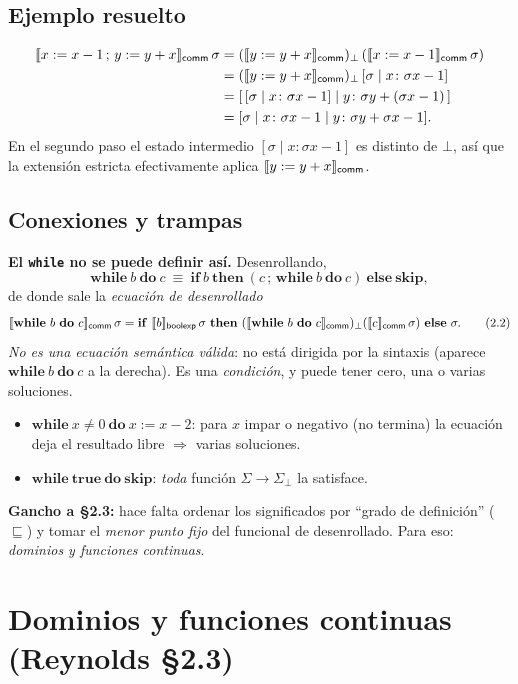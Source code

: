 \subsection*{Ejemplo resuelto}
\[
\begin{aligned}
\llbracket x := x-1\,;\,y := y+x \rrbracket_{\mathsf{comm}}\,\sigma
&= (\llbracket y := y+x \rrbracket_{\mathsf{comm}})_\bot\,(\llbracket x := x-1 \rrbracket_{\mathsf{comm}}\,\sigma) \\
&= (\llbracket y := y+x \rrbracket_{\mathsf{comm}})_\bot\,[\sigma \mid x\colon \sigma x - 1] \\
&= [\,[\sigma \mid x\colon \sigma x - 1] \mid y\colon \sigma y + (\sigma x - 1)\,] \\
&= [\sigma \mid x\colon \sigma x - 1 \mid y\colon \sigma y + \sigma x - 1].
\end{aligned}
\]
En el segundo paso el estado intermedio $[\sigma \mid x\colon \sigma x - 1]$ es
distinto de $\bot$, así que la extensión estricta efectivamente aplica
$\llbracket y := y+x \rrbracket_{\mathsf{comm}}$.

\subsection*{Conexiones y trampas}
\textbf{El \texttt{while} no se puede definir así.} Desenrollando,
\[
\mathbf{while}\ b\ \mathbf{do}\ c \ \equiv\
\mathbf{if}\ b\ \mathbf{then}\ (c\,;\,\mathbf{while}\ b\ \mathbf{do}\ c)\ \mathbf{else}\ \mathbf{skip},
\]
de donde sale la \emph{ecuación de desenrollado}
\[
\semc{\mathbf{while}\ b\ \mathbf{do}\ c}\,\sigma
= \mathbf{if}\ \semb{b}\,\sigma\ \mathbf{then}\
   (\semc{\mathbf{while}\ b\ \mathbf{do}\ c})_\bot(\semc{c}\,\sigma)\ \mathbf{else}\ \sigma.
\tag{2.2}
\]
\emph{No es una ecuación semántica válida}: no está dirigida por la sintaxis
(aparece $\mathbf{while}\ b\ \mathbf{do}\ c$ a la derecha). Es una \emph{condición},
y puede tener cero, una o varias soluciones.
\begin{itemize}
  \item $\mathbf{while}\ x \neq 0\ \mathbf{do}\ x := x-2$: para $x$ impar o negativo
        (no termina) la ecuación deja el resultado libre $\Rightarrow$ varias soluciones.
  \item $\mathbf{while}\ \mathbf{true}\ \mathbf{do}\ \mathbf{skip}$: \emph{toda} función
        $\Sigma \to \Sigma_\bot$ la satisface.
\end{itemize}
\textbf{Gancho a §2.3:} hace falta ordenar los significados por ``grado de
definición'' ($\sqsubseteq$) y tomar el \emph{menor punto fijo} del funcional de
desenrollado. Para eso: \emph{dominios y funciones continuas}.

\section{Dominios y funciones continuas (Reynolds §2.3)}


